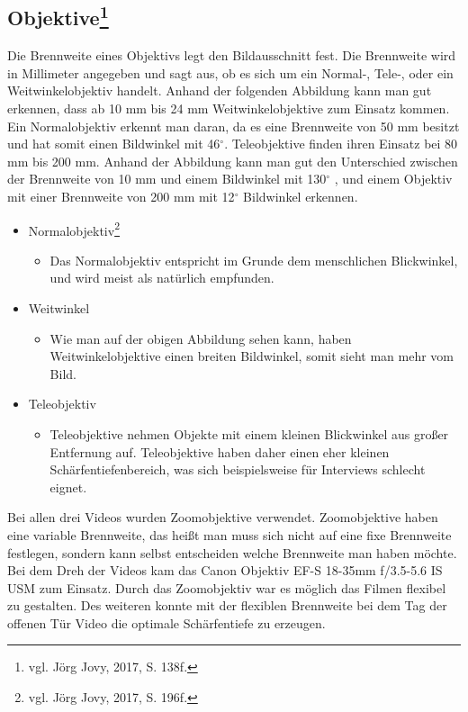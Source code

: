 \subsection[Objektive]{Objektive\protect\footnote{\label{}vgl. Jörg Jovy, 2017, S. 138f.}}
Die Brennweite eines Objektivs legt den Bildausschnitt fest. Die Brennweite wird in Millimeter angegeben und sagt aus, ob es sich um ein Normal-, Tele-, oder ein Weitwinkelobjektiv handelt.
Anhand der folgenden Abbildung kann man gut erkennen, dass ab 10 mm bis 24 mm Weitwinkelobjektive zum Einsatz kommen. Ein Normalobjektiv erkennt man daran, da es eine Brennweite von 50 mm besitzt und hat somit einen Bildwinkel mit 46$^\circ$. Teleobjektive finden ihren Einsatz bei 80 mm bis 200 mm. Anhand der Abbildung kann man gut den Unterschied zwischen der Brennweite von 10 mm und einem Bildwinkel mit 130$^\circ$ , und einem Objektiv mit einer Brennweite von 200 mm mit 12$^\circ$ Bildwinkel erkennen. 
\begin{itemize}
	\item Normalobjektiv\footnote{\label{}vgl. Jörg Jovy, 2017, S. 196f.}
		\begin{itemize}
		\item Das Normalobjektiv entspricht im Grunde dem menschlichen Blickwinkel, und wird meist als natürlich empfunden. 
		\end{itemize}
	\item Weitwinkel
		\begin{itemize}
		\item Wie man auf der obigen Abbildung sehen kann, haben Weitwinkelobjektive einen breiten Bildwinkel, somit sieht man mehr vom Bild. 
		\end{itemize}
	\item Teleobjektiv
		\begin{itemize}
		\item Teleobjektive nehmen Objekte mit einem kleinen Blickwinkel aus großer Entfernung auf. Teleobjektive haben daher einen eher kleinen Schärfentiefenbereich, was sich beispielsweise für Interviews schlecht eignet. 
\end{itemize}
\end{itemize}
Bei allen drei Videos wurden Zoomobjektive verwendet. Zoomobjektive haben eine variable Brennweite, das heißt man muss sich nicht auf eine fixe Brennweite festlegen, sondern kann selbst entscheiden welche Brennweite man haben möchte. Bei dem Dreh der Videos kam das Canon Objektiv EF-S 18-35mm f/3.5-5.6 IS USM zum Einsatz. Durch das Zoomobjektiv war es möglich das Filmen flexibel zu gestalten. Des weiteren konnte mit der flexiblen Brennweite bei dem Tag der offenen Tür Video die optimale Schärfentiefe zu erzeugen.

